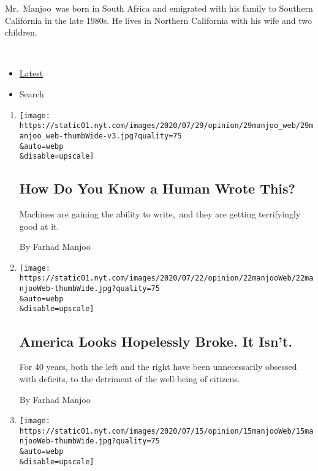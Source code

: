 Mr.~Manjoo~was born in South Africa and emigrated with his family to
Southern California in the late 1980s. He lives in Northern California
with his wife and two children.~

~

\begin{itemize}
\tightlist
\item
  \protect\hyperlink{stream-panel}{Latest}
\item
  Search
\end{itemize}

\begin{enumerate}
\def\labelenumi{\arabic{enumi}.}
\item
  \href{/2020/07/29/opinion/gpt-3-ai-automation.html}{}

  \texttt{[image: https://static01.nyt.com/images/2020/07/29/opinion/29manjoo\_web/29manjoo\_web-thumbWide-v3.jpg?quality=75\\\&auto=webp\\\&disable=upscale]}

  \hypertarget{how-do-you-know-a-human-wrote-this}{%
  \subsection{How Do You Know a Human Wrote
  This?}\label{how-do-you-know-a-human-wrote-this}}

  Machines are gaining the ability to write,~and they are getting
  terrifyingly good at it.

  By Farhad Manjoo
\item
  \href{/2020/07/22/opinion/economy-spending-modern-monetary-theory.html}{}

  \texttt{[image: https://static01.nyt.com/images/2020/07/22/opinion/22manjooWeb/22manjooWeb-thumbWide.jpg?quality=75\\\&auto=webp\\\&disable=upscale]}

  \hypertarget{america-looks-hopelessly-broke-it-isnt}{%
  \subsection{America Looks Hopelessly Broke. It
  Isn't.}\label{america-looks-hopelessly-broke-it-isnt}}

  For 40 years, both the left and the right have been unnecessarily
  obsessed with deficits, to the detriment of the well-being of
  citizens.

  By Farhad Manjoo
\item
  \href{/2020/07/15/opinion/schools-reopening.html}{}

  \texttt{[image: https://static01.nyt.com/images/2020/07/15/opinion/15manjooWeb/15manjooWeb-thumbWide.jpg?quality=75\\\&auto=webp\\\&disable=upscale]}


\end{enumerate}
